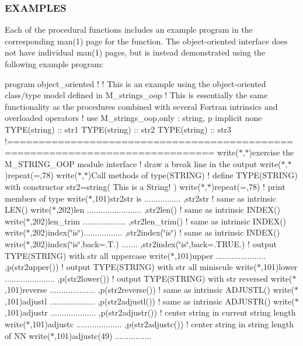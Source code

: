 \subsubsection*{E\+X\+A\+M\+P\+L\+ES}

Each of the procedural functions includes an example program in the corresponding man(1) page for the function. The object-\/oriented interface does not have individual man(1) pages, but is instead demonstrated using the following example program\+:

program object\+\_\+oriented ! ! This is an example using the object-\/oriented class/type model defined in M\+\_\+strings\+\_\+oop ! This is essentially the same functionality as the procedures combined with several Fortran intrinsics and overloaded operators ! use M\+\_\+strings\+\_\+oop,only \+: string, p implicit none T\+Y\+P\+E(string) \+:\+: str1 T\+Y\+P\+E(string) \+:\+: str2 T\+Y\+P\+E(string) \+:\+: str3 !============================================================================== write($\ast$,$\ast$)\textquotesingle{}exercise the M\+\_\+\+S\+T\+R\+I\+N\+G\+\_\+\+O\+OP module interface\textquotesingle{} ! draw a break line in the output write($\ast$,$\ast$)repeat(\textquotesingle{}=\textquotesingle{},78) write($\ast$,$\ast$)\textquotesingle{}Call methods of type(\+S\+T\+R\+I\+N\+G)\textquotesingle{} ! define T\+Y\+P\+E(\+S\+T\+R\+I\+N\+G) with constructor str2=string(\textquotesingle{} This is a String! \textquotesingle{}) write($\ast$,$\ast$)repeat(\textquotesingle{}=\textquotesingle{},78) ! print members of type write($\ast$,101)\textquotesingle{}str2str is ................ \textquotesingle{},str2str ! same as intrinsic L\+E\+N() write($\ast$,202)\textquotesingle{}len ........................ \textquotesingle{},str2len() ! same as intrinsic I\+N\+D\+E\+X() write($\ast$,202)\textquotesingle{}len\+\_\+trim ................... \textquotesingle{},str2len\+\_\+trim() ! same as intrinsic I\+N\+D\+E\+X() write($\ast$,202)\textquotesingle{}index(\char`\"{}is\char`\"{})................. \textquotesingle{},str2index(\char`\"{}is\char`\"{}) ! same as intrinsic I\+N\+D\+E\+X() write($\ast$,202)\textquotesingle{}index(\char`\"{}is\char`\"{},back=.T.) ....... \textquotesingle{},str2index(\char`\"{}is\char`\"{},back=.T\+R\+UE.) ! output T\+Y\+P\+E(\+S\+T\+R\+I\+N\+G) with str all uppercase write($\ast$,101)\textquotesingle{}upper ...................... \textquotesingle{},p(str2upper()) ! output T\+Y\+P\+E(\+S\+T\+R\+I\+N\+G) with str all miniscule write($\ast$,101)\textquotesingle{}lower ...................... \textquotesingle{},p(str2lower()) ! output T\+Y\+P\+E(\+S\+T\+R\+I\+N\+G) with str reversed write($\ast$,101)\textquotesingle{}reverse .................... \textquotesingle{},p(str2reverse()) ! same as intrinsic A\+D\+J\+U\+S\+T\+L() write($\ast$,101)\textquotesingle{}adjustl .................... \textquotesingle{},p(str2adjustl()) ! same as intrinsic A\+D\+J\+U\+S\+T\+R() write($\ast$,101)\textquotesingle{}adjustr .................... \textquotesingle{},p(str2adjustr()) ! center string in current string length write($\ast$,101)\textquotesingle{}adjustc .................... \textquotesingle{},p(str2adjustc()) ! center string in string length of NN write($\ast$,101)\textquotesingle{}adjustc(49) ................ 